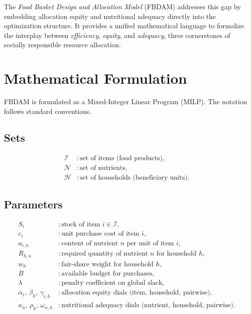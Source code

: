 \documentclass[preprint,12pt]{elsarticle}
\begin{document}
The \emph{Food Basket Design and Allocation Model} (FBDAM) addresses this gap by embedding allocation equity and nutritional adequacy directly into the optimization structure. It provides a unified mathematical language to formalize the interplay between \emph{efficiency}, \emph{equity}, and \emph{adequacy}, three cornerstones of socially responsible resource allocation.

\section{Mathematical Formulation}
\label{sec:model}
FBDAM is formulated as a Mixed-Integer Linear Program (MILP). The notation follows standard conventions.

\subsection{Sets}
\begin{align*}
\mathcal{I} &: \text{set of items (food products)},\\
\mathcal{N} &: \text{set of nutrients},\\
\mathcal{H} &: \text{set of households (beneficiary units)}.
\end{align*}

\subsection{Parameters}
\begin{align*}
S_i & : \text{stock of item } i \in \mathcal{I},\\
c_i & : \text{unit purchase cost of item } i,\\
a_{i,n} & : \text{content of nutrient } n \text{ per unit of item } i,\\
R_{h,n} & : \text{required quantity of nutrient } n \text{ for household } h,\\
w_h & : \text{fair-share weight for household } h,\\
B & : \text{available budget for purchases},\\
\lambda & : \text{penalty coefficient on global slack},\\
\alpha_i,\, \beta_h,\, \gamma_{i,h} & : \text{allocation equity dials (item, household, pairwise)},\\
\kappa_n,\, \rho_h, \, \omega_{n,h} & : \text{nutritional adequacy dials (nutrient, household, pairwise)}.
\end{align*}
\end{document}
